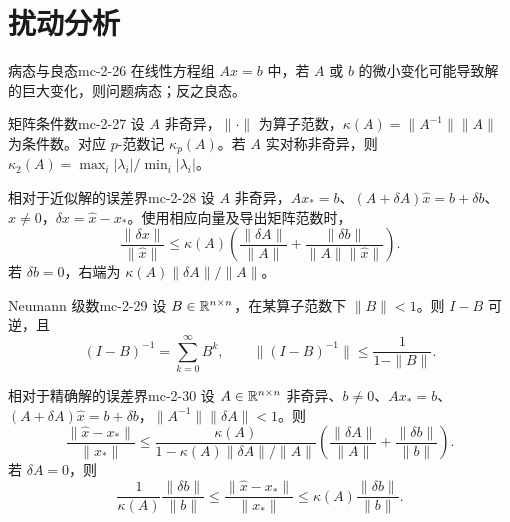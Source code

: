 \section{扰动分析}

\begin{definition}{病态与良态}{mc-2-26}
在线性方程组 $Ax=b$ 中，若 $A$ 或 $b$ 的微小变化可能导致解的巨大变化，则问题病态；反之良态。
\end{definition}

\begin{definition}{矩阵条件数}{mc-2-27}
设 $A$ 非奇异，$\|\cdot\|$ 为算子范数，$\kappa(A)=\|A^{-1}\|\|A\|$ 为条件数。对应 $p$-范数记 $\kappa_p(A)$。若 $A$ 实对称非奇异，则 $\kappa_2(A)=\max_i|\lambda_i|/\min_i|\lambda_i|$。
\end{definition}

\begin{theorem}{相对于近似解的误差界}{mc-2-28}
设 $A$ 非奇异，$Ax_*=b$、$(A+\delta A)\widehat x=b+\delta b$、$\widehat x\ne0$，$\delta x=\widehat x-x_*$。使用相应向量及导出矩阵范数时，
\[\frac{\|\delta x\|}{\|\widehat x\|}\leq\kappa(A)\left(\frac{\|\delta A\|}{\|A\|}+\frac{\|\delta b\|}{\|A\|\|\widehat x\|}\right).\]
若 $\delta b=0$，右端为 $\kappa(A)\|\delta A\|/\|A\|$。
\end{theorem}

\begin{lemma}{Neumann 级数}{mc-2-29}
设 $B\in\mathbb{R}^{n\times n}$，在某算子范数下 $\|B\|<1$。则 $I-B$ 可逆，且
\[(I-B)^{-1}=\sum_{k=0}^\infty B^k,\qquad\|(I-B)^{-1}\|\leq\frac1{1-\|B\|}.\]
\end{lemma}

\begin{theorem}{相对于精确解的误差界}{mc-2-30}
设 $A\in\mathbb{R}^{n\times n}$ 非奇异、$b\ne0$、$Ax_*=b$、$(A+\delta A)\widehat x=b+\delta b$，$\|A^{-1}\|\|\delta A\|<1$。则
\[\frac{\|\widehat x-x_*\|}{\|x_*\|}\leq\frac{\kappa(A)}{1-\kappa(A)\|\delta A\|/\|A\|}\left(\frac{\|\delta A\|}{\|A\|}+\frac{\|\delta b\|}{\|b\|}\right).\]
若 $\delta A=0$，则
\[\frac1{\kappa(A)}\frac{\|\delta b\|}{\|b\|}\leq\frac{\|\widehat x-x_*\|}{\|x_*\|}\leq\kappa(A)\frac{\|\delta b\|}{\|b\|}.\]
\end{theorem}

